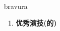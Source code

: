 
\begin{frame}
{\huge bravura}
\begin{center}
\begin{enumerate}\Large
  \item \textbf{优秀演技(的)}
\end{enumerate}
\end{center}
\end{frame}
